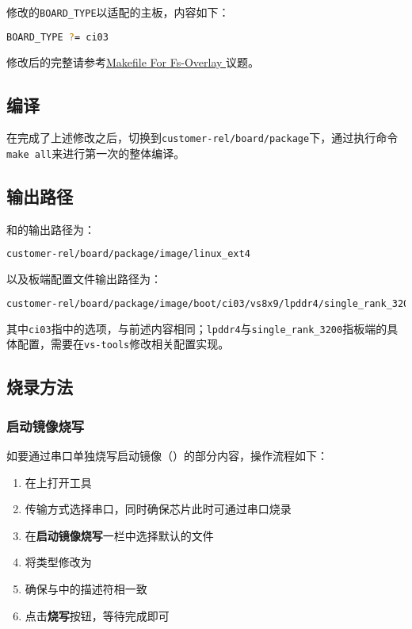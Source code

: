 \documentclass[UTF8]{ctexart}
\newcommand{\code}[1]{\colorbox{gray!10}{\lstinline[style=inlinecode]|#1|}}
\begin{document}
修改的\code{BOARD_TYPE}以适配的主板，内容如下：

\begin{lstlisting}[language=sh]
BOARD_TYPE ?= ci03
\end{lstlisting}

\noindent 修改后的完整请参考\href{http://192.168.110.252:12123/general/sdk/visinex/vs8x9_fs-overlay/-/issues/1}{Makefile For Fs-Overlay
}议题。

\subsection{编译}

在完成了上述修改之后，切换到\code{customer-rel/board/package}下，通过执行命令\code{make all}来进行第一次的整体编译。

\subsection{输出路径}

和的输出路径为：

\begin{lstlisting}[language=sh]
customer-rel/board/package/image/linux_ext4
\end{lstlisting}

以及板端配置文件输出路径为：

\begin{lstlisting}[language=sh]
customer-rel/board/package/image/boot/ci03/vs8x9/lpddr4/single_rank_3200
\end{lstlisting}

\noindent 其中\code{ci03}指中的选项，与前述内容相同；\code{lpddr4}与\code{single_rank_3200}指板端的具体配置，需要在\code{vs-tools}修改相关配置实现。

\subsection{烧录方法}

\subsubsection{启动镜像烧写}

如要通过串口单独烧写启动镜像（）的部分内容，操作流程如下：

\begin{enumerate}
    \item 在上打开工具
    \item 传输方式选择串口，同时确保芯片此时可通过串口烧录
    \item 在\textbf{启动镜像烧写}一栏中选择默认的文件
    \item 将类型修改为
    \item 确保与中的描述符相一致
    \item 点击\textbf{烧写}按钮，等待完成即可
\end{enumerate}
\end{document}

